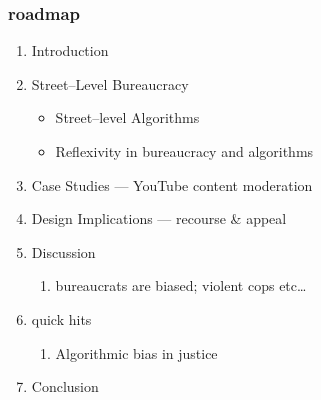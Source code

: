 \documentclass[presentation]{subfiles}
\begin{document}
\begin{frame}\frametitle{roadmap}
\begin{enumerate}
  \item {Introduction}                                          
  \item {Street--Level Bureaucracy}                             
    
    \begin{itemize}
      \item Street--level Algorithms                            
      \item Reflexivity in bureaucracy and algorithms           
    \end{itemize}
    
  \item {Case Studies --- YouTube content moderation}     
  

  \item {Design Implications --- recourse \& appeal}                
  
  
  \item {Discussion}                                            
  \begin{enumerate}
    \item bureaucrats are biased; violent cops etc\dots
  \end{enumerate}
  
  \item quick hits
  \begin{enumerate}
    \item Algorithmic bias in justice                           
  \end{enumerate}
  
  \item {Conclusion}                                            
\end{enumerate}
\end{frame}
\end{document}
